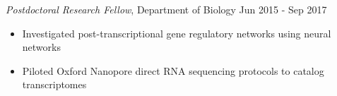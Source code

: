 \documentclass[margin,line]{res}
\begin{document}
\begin{resume}
{\em Postdoctoral Research Fellow}, Department of Biology \hfill {Jun 2015 - Sep 2017}
\begin{itemize}
\itemsep0em 
	\item Investigated post-transcriptional gene regulatory networks using neural networks
	\item Piloted Oxford Nanopore direct RNA sequencing protocols to catalog transcriptomes
\end{itemize}







\end{resume}
\end{document}
